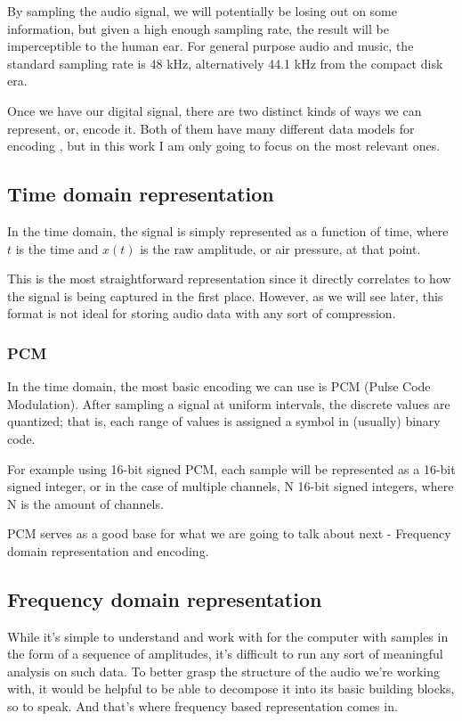 By sampling the audio signal, we will potentially be losing out on some information, but given a high enough sampling rate, the result will be imperceptible to the human ear. For general purpose audio and music, the standard sampling rate is 48 kHz, alternatively 44.1 kHz from the compact disk era.

Once we have our digital signal, there are two distinct kinds of ways we can represent, or, encode it. Both of them have many different data models for encoding \cite{you_2010}, but in this work I am only going to focus on the most relevant ones.

\subsection{Time domain representation}
In the time domain, the signal is simply represented as a function of time, where $t$ is the time and $x(t)$ is the raw amplitude, or air pressure, at that point. \cite{bosi_goldberg_2003}

This is the most straightforward representation since it directly correlates to how the signal is being captured in the first place. However, as we will see later, this format is not ideal for storing audio data with any sort of compression.

\subsubsection{PCM}
In the time domain, the most basic encoding we can use is PCM (Pulse Code Modulation). After sampling a signal at uniform intervals, the discrete values are quantized; that is, each range of values is assigned a symbol in (usually) binary code.

For example using 16-bit signed PCM, each sample will be represented as a 16-bit signed integer, or in the case of multiple channels, N 16-bit signed integers, where N is the amount of channels.

PCM serves as a good base for what we are going to talk about next - Frequency domain representation and encoding.

\subsection{Frequency domain representation}
While it's simple to understand and work with for the computer with samples in the form of a sequence of amplitudes, it's difficult to run any sort of meaningful analysis on such data. To better grasp the structure of the audio we're working with, it would be helpful to be able to decompose it into its basic building blocks, so to speak. And that's where frequency based representation comes in.

